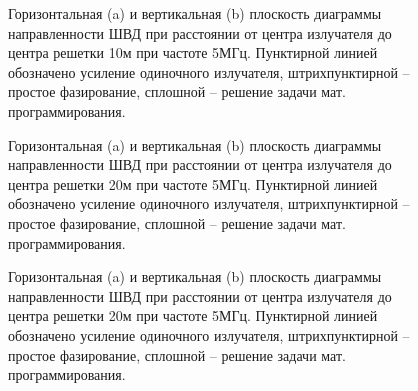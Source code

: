 \begin{figure}
\begin{minipage}[h]{0.49\linewidth}
\end{minipage}
\hfill
\begin{minipage}[h]{0.49\linewidth}
\end{minipage}
\caption{Горизонтальная (a) и вертикальная (b) плоскость диаграммы направленности ШВД при расстоянии от центра излучателя до центра решетки 10м при частоте 5МГц. Пунктирной линией обозначено усиление одиночного излучателя, штрихпунктирной -- простое фазирование, сплошной -- решение задачи мат. программирования.}
\label{ris:bvd_mut_5_10}
\end{figure}

\begin{figure}
\begin{minipage}[h]{0.49\linewidth}
\end{minipage}
\hfill
\begin{minipage}[h]{0.49\linewidth}
\end{minipage}
\caption{Горизонтальная (a) и вертикальная (b) плоскость диаграммы направленности ШВД при расстоянии от центра излучателя до центра решетки 20м при частоте 5МГц. Пунктирной линией обозначено усиление одиночного излучателя, штрихпунктирной -- простое фазирование, сплошной -- решение задачи мат. программирования.}
\label{ris:bvd_mut_5_20}
\end{figure}


\begin{figure}
\begin{minipage}[h]{0.49\linewidth}
\end{minipage}
\hfill
\begin{minipage}[h]{0.49\linewidth}
\end{minipage}
\caption{Горизонтальная (a) и вертикальная (b) плоскость диаграммы направленности ШВД при расстоянии от центра излучателя до центра решетки 20м при частоте 5МГц. Пунктирной линией обозначено усиление одиночного излучателя, штрихпунктирной -- простое фазирование, сплошной -- решение задачи мат. программирования.}
\label{ris:bvd_mut_5_20}
\end{figure}

